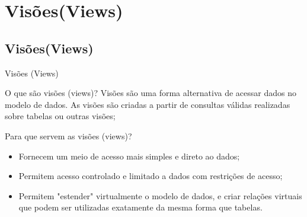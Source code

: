 \documentclass[xcolor=x11names,compress]{beamer}
\begin{document}
\section{Visões(Views)}
\subsection{Visões(Views)}

\begin{frame}{Visões (Views)}

\begin{alertblock}{O que são visões (views)?}
Visões são uma forma alternativa de acessar dados no modelo de dados. As visões são criadas a partir de consultas válidas realizadas sobre tabelas ou outras visões;
\end{alertblock}

\pause 

\begin{alertblock}{Para que servem as visões (views)?}

\begin{itemize}
\itemsep 3mm
\item Fornecem um meio de acesso mais simples e direto ao dados;

\item Permitem acesso controlado e limitado a dados com restrições de acesso;

\item Permitem "estender" virtualmente o modelo de dados, e criar relações virtuais que podem ser utilizadas exatamente da mesma forma que tabelas.

\end{itemize}

\end{alertblock} 

\end{frame}
\end{document}
